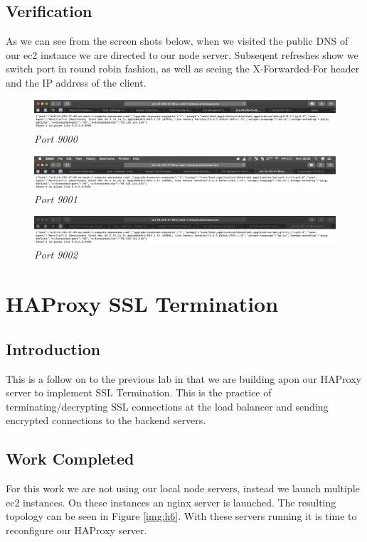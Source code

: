 \subsection{Verification}
As we can see from the screen shots below, when we visited the public DNS of our ec2 instance we are directed to our node server. Subseqent refreshes show we switch port in round robin fashion, as well as seeing the X-Forwarded-For header and the IP address of the client.
\begin{figure}[!hb]
\centering
\includegraphics*[width=1\textwidth]{images/h3.png}
\caption{\em Port 9000}
\label{img:h1}
\end{figure}

\begin{figure}[!hb]
\centering
\includegraphics*[width=1\textwidth]{images/h2.png}
\caption{\em Port 9001}
\label{img:h2}
\end{figure}

\begin{figure}[!hb]
\centering
\includegraphics*[width=1\textwidth]{images/h1.png}
\caption{\em Port 9002}
\label{img:h3}
\end{figure}

\clearpage
\section{HAProxy SSL Termination}
\label{sub:hassl}
\subsection{Introduction}
This is a follow on to the previous lab in that we are building apon our HAProxy server to implement SSL Termination. This is the practice of terminating/decrypting SSL connections at the load balancer and sending encrypted connections to the backend servers.
\subsection{Work Completed}
For this work we are not using our local node servers, instead we launch multiple ec2 instances. On these instances an nginx server is launched. The resulting topology can be seen in Figure \ref{img:h6}. With these servers running it is time to reconfigure our HAProxy server.

